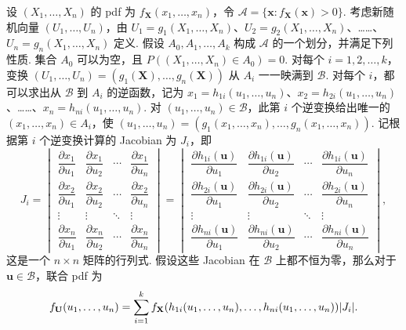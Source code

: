 设 $(X_1,\ldots,X_n)$ 的 pdf 为 $f_{\mathbf X}(x_1,\ldots,x_n)$，令 $\mathscr A=\{\mathbf x:f_{\mathbf X}(\mathbf x)>0\}$. 考虑新随机向量 $(U_1,\ldots,U_n)$，由 $U_1=g_1(X_1,\ldots,X_n)$、$U_2=g_2(X_1,\ldots,X_n)$、……、$U_n=g_n(X_1,\ldots,X_n)$ 定义. 假设 $A_0,A_1,\ldots,A_k$ 构成 $\mathscr A$ 的一个划分，并满足下列性质. 集合 $A_0$ 可以为空，且 $P((X_1,\ldots,X_n)\in A_0)=0$. 对每个 $i=1,2,\ldots,k$，变换 $(U_1,\ldots,U_n)=(g_1(\mathbf X),\ldots,g_n(\mathbf X))$ 从 $A_i$ 一一映满到 $\mathscr B$. 对每个 $i$，都可以求出从 $\mathscr B$ 到 $A_i$ 的逆函数，记为 $x_1=h_{1i}(u_1,\ldots,u_n)$、$x_2=h_{2i}(u_1,\ldots,u_n)$、……、$x_n=h_{ni}(u_1,\ldots,u_n)$. 对 $(u_1,\ldots,u_n)\in\mathscr B$，此第 $i$ 个逆变换给出唯一的 $(x_1,\ldots,x_n)\in A_i$，使 $(u_1,\ldots,u_n)=(g_1(x_1,\ldots,x_n),\ldots,g_n(x_1,\ldots,x_n))$. 记根据第 $i$ 个逆变换计算的 Jacobian 为 $J_i$，即
$$J_i=\begin{vmatrix}
\dfrac{\partial x_1}{\partial u_1}&\dfrac{\partial x_1}{\partial u_2}&\cdots&\dfrac{\partial x_1}{\partial u_n}\\[4pt]
\dfrac{\partial x_2}{\partial u_1}&\dfrac{\partial x_2}{\partial u_2}&\cdots&\dfrac{\partial x_2}{\partial u_n}\\[4pt]
\vdots&\vdots&\ddots&\vdots\\
\dfrac{\partial x_n}{\partial u_1}&\dfrac{\partial x_n}{\partial u_2}&\cdots&\dfrac{\partial x_n}{\partial u_n}
\end{vmatrix}
=\begin{vmatrix}
\dfrac{\partial h_{1i}(\mathbf u)}{\partial u_1}&\dfrac{\partial h_{1i}(\mathbf u)}{\partial u_2}&\cdots&\dfrac{\partial h_{1i}(\mathbf u)}{\partial u_n}\\[4pt]
\dfrac{\partial h_{2i}(\mathbf u)}{\partial u_1}&\dfrac{\partial h_{2i}(\mathbf u)}{\partial u_2}&\cdots&\dfrac{\partial h_{2i}(\mathbf u)}{\partial u_n}\\[4pt]
\vdots&\vdots&\ddots&\vdots\\
\dfrac{\partial h_{ni}(\mathbf u)}{\partial u_1}&\dfrac{\partial h_{ni}(\mathbf u)}{\partial u_2}&\cdots&\dfrac{\partial h_{ni}(\mathbf u)}{\partial u_n}
\end{vmatrix},$$
这是一个 $n\times n$ 矩阵的行列式. 假设这些 Jacobian 在 $\mathscr B$ 上都不恒为零，那么对于 $\mathbf u\in\mathscr B$，联合 pdf 为
\begin{equation}\label{eq:4.6.7}\index{SI0836@多元变换}
f_{\mathbf U}(u_1,\ldots,u_n)=\sum_{i=1}^k f_{\mathbf X}(h_{1i}(u_1,\ldots,u_n),\ldots,h_{ni}(u_1,\ldots,u_n))|J_i|.
\end{equation}

